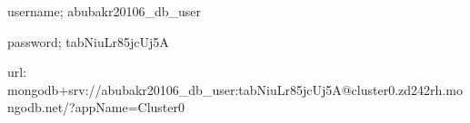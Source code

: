 username; abubakr20106_db_user



password; tabNiuLr85jcUj5A


url: mongodb+srv://abubakr20106_db_user:tabNiuLr85jcUj5A@cluster0.zd242rh.mongodb.net/?appName=Cluster0